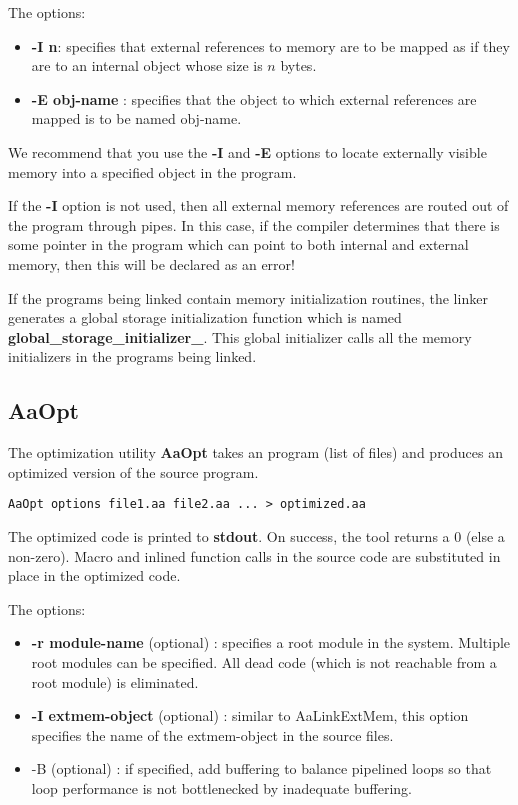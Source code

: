 The options:
\begin{itemize}
\item {\bf -I n}: specifies that external references to memory
are to be mapped as if they are to an internal object whose size
is $n$ bytes.
\item {\bf -E obj-name} : specifies that the object to which
external references are mapped is to be named obj-name.
\end{itemize}
We recommend that you use the {\bf -I} and {\bf -E} options to
locate externally visible memory into a specified object in the
\Aa program.   

If the {\bf -I} option is not used, then all external memory
references are routed out of the \Aa program through pipes.
In this case, if the \Aa compiler determines that there is some pointer 
in the program which can point
to both internal and external memory, then this will be
declared as an error!  

If the programs being linked contain memory initialization
routines, the linker generates a global storage initialization
function which is named {\bf global\_storage\_initializer\_}.
This global initializer calls all the memory initializers in
the programs being linked.

\subsection{{\bf AaOpt}}

The optimization utility {\bf AaOpt} takes an \Aa program (list of
\Aa files) and produces an optimized version of the source program.
\begin{verbatim}
AaOpt options file1.aa file2.aa ... > optimized.aa
\end{verbatim}
The optimized \Aa code is printed to {\bf stdout}.  On success, 
the tool returns a 0 (else a non-zero).  Macro and inlined
function calls in the source code are substituted in place
in the optimized code.

The options:
\begin{itemize}
\item {\bf -r module-name} (optional) : specifies a root module in the
system.  Multiple root modules can be specified.  All dead code (which
is not reachable from a root module) is eliminated.
\item {\bf -I extmem-object} (optional) : similar to AaLinkExtMem,
this option specifies the name of the extmem-object in the
source \Aa files.
\item {-B} (optional) : if specified, add buffering to balance pipelined
loops so that loop performance is not bottlenecked by inadequate
buffering.
\end{itemize}



